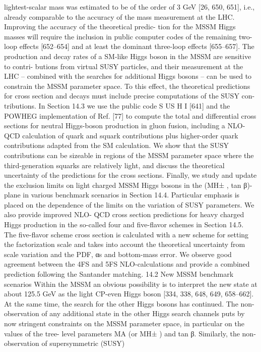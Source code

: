 lightest-scalar mass was estimated to be of the order of 3 GeV [26, 650, 651], i.e., already comparable
to the accuracy of the mass measurement at the LHC. Improving the accuracy of the theoretical predic-
tion for the MSSM Higgs masses will require the inclusion in public computer codes of the remaining
two-loop effects [652–654] and at least the dominant three-loop effects [655–657].
The production and decay rates of a SM-like Higgs boson in the MSSM are sensitive to contri-
butions from virtual SUSY particles, and their measurement at the LHC – combined with the searches
for additional Higgs bosons – can be used to constrain the MSSM parameter space. To this effect, the
theoretical predictions for cross section and decays must include precise computations of the SUSY con-
tributions. In Section 14.3 we use the public code S US H I [641] and the POWHEG implementation of
Ref. [77] to compute the total and differential cross sections for neutral Higgs-boson production in gluon
fusion, including a NLO-QCD calculation of quark and squark contributions plus higher-order quark
contributions adapted from the SM calculation. We show that the SUSY contributions can be sizeable in
regions of the MSSM parameter space where the third-generation squarks are relatively light, and discuss
the theoretical uncertainty of the predictions for the cross sections.
Finally, we study and update the exclusion limits on light charged MSSM Higgs bosons in the
(MH± , tan β)-plane in various benchmark scenarios in Section 14.4. Particular emphasis is placed on
the dependence of the limits on the variation of SUSY parameters. We also provide improved NLO-
QCD cross section predictions for heavy charged Higgs production in the so-called four and five-flavor
schemes in Section 14.5. The five-flavor scheme cross section is calculated with a new scheme for setting
the factorization scale and takes into account the theoretical uncertainty from scale variation and the PDF,
αs and bottom-mass error. We observe good agreement between the 4FS and 5FS NLO-calculations and
provide a combined prediction following the Santander matching.
14.2
New MSSM benchmark scenarios
Within the MSSM an obvious possibility is to interpret the new state at about 125.5 GeV as the light
CP-even Higgs boson [334, 338, 648, 649, 658–662]. At the same time, the search for the other Higgs
bosons has continued. The non-observation of any additional state in the other Higgs search channels
puts by now stringent constraints on the MSSM parameter space, in particular on the values of the tree-
level parameters MA (or MH± ) and tan β. Similarly, the non-observation of supersymmetric (SUSY)
